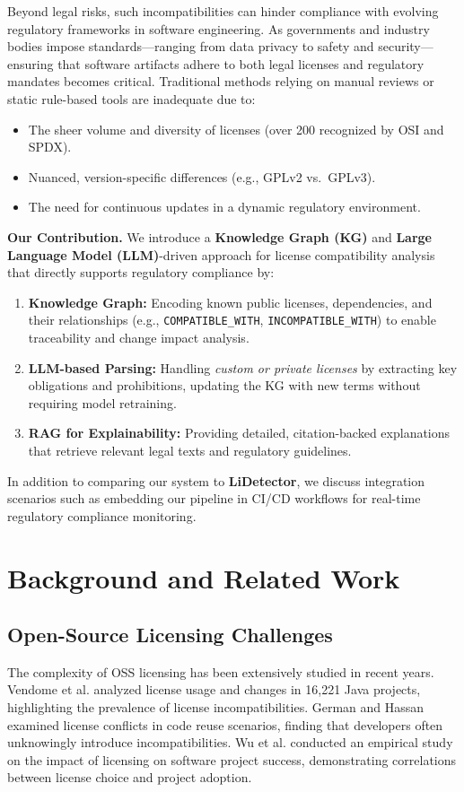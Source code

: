\documentclass[12pt]{article}
\begin{document}
Beyond legal risks, such incompatibilities can hinder compliance with evolving regulatory frameworks in software engineering. As governments and industry bodies impose standards—ranging from data privacy to safety and security—ensuring that software artifacts adhere to both legal licenses and regulatory mandates becomes critical. Traditional methods relying on manual reviews or static rule-based tools are inadequate due to:
\begin{itemize}
    \item The sheer volume and diversity of licenses (over 200 recognized by OSI and SPDX).
    \item Nuanced, version-specific differences (e.g., GPLv2 vs.\ GPLv3).
    \item The need for continuous updates in a dynamic regulatory environment.
\end{itemize}

\textbf{Our Contribution.} We introduce a \textbf{Knowledge Graph (KG)} and \textbf{Large Language Model (LLM)}-driven approach for license compatibility analysis that directly supports regulatory compliance by:
\begin{enumerate}
    \item \textbf{Knowledge Graph:} Encoding known public licenses, dependencies, and their relationships (e.g., \texttt{COMPATIBLE\_WITH}, \texttt{INCOMPATIBLE\_WITH}) to enable traceability and change impact analysis.
    \item \textbf{LLM-based Parsing:} Handling \emph{custom or private licenses} by extracting key obligations and prohibitions, updating the KG with new terms without requiring model retraining.
    \item \textbf{RAG for Explainability:} Providing detailed, citation-backed explanations that retrieve relevant legal texts and regulatory guidelines.
\end{enumerate}
In addition to comparing our system to \textbf{LiDetector}, we discuss integration scenarios such as embedding our pipeline in CI/CD workflows for real-time regulatory compliance monitoring.

\section{Background and Related Work}
\label{sec:related}

\subsection{Open-Source Licensing Challenges}
The complexity of OSS licensing has been extensively studied in recent years. Vendome et al. \cite{vendome2017license} analyzed license usage and changes in 16,221 Java projects, highlighting the prevalence of license incompatibilities. German and Hassan \cite{german2009license} examined license conflicts in code reuse scenarios, finding that developers often unknowingly introduce incompatibilities. Wu et al. \cite{wu2017empirical} conducted an empirical study on the impact of licensing on software project success, demonstrating correlations between license choice and project adoption.
\end{document}
